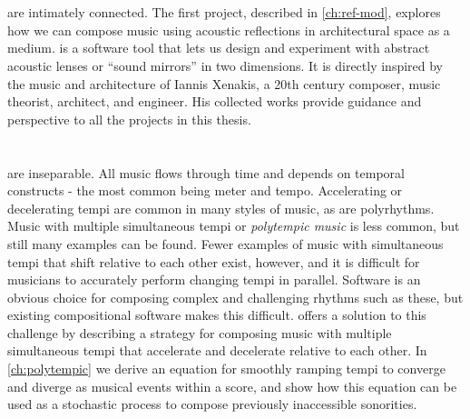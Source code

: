 \section{}
\label{sec:refmod-intro}
 are intimately connected. The first
project, described in \autoref{ch:ref-mod}, explores how we can
compose music using acoustic reflections in architectural space as a
medium.  is a software tool that lets us design and experiment
with abstract acoustic lenses or ``sound mirrors'' in two
dimensions. It is directly inspired by the music and architecture of
Iannis Xenakis, a 20th century composer, music theorist, architect,
and engineer. His collected works provide guidance and perspective to
all the projects in this thesis.

\section{\polytempic}
\label{sec:polytempic-intro}

 are inseparable. All music flows through
time and depends on temporal constructs - the most common being meter
and tempo. Accelerating or decelerating tempi are common in many
styles of music, as are polyrhythms.  Music with multiple simultaneous
tempi or \textit{polytempic music} is less common, but still many
examples can be found. Fewer examples of music with simultaneous tempi
that shift relative to each other exist, however, and it is difficult
for musicians to accurately perform changing tempi in
parallel. Software is an obvious choice for composing complex and
challenging rhythms such as these, but existing compositional software
makes this difficult. \polytempic offers a solution to this challenge
by describing a strategy for composing music with multiple
simultaneous tempi that accelerate and decelerate relative to each
other. In \autoref{ch:polytempic} we derive an equation for smoothly
ramping tempi to converge and diverge as musical events within a
score, and show how this equation can be used as a stochastic process
to compose previously inaccessible sonorities.

